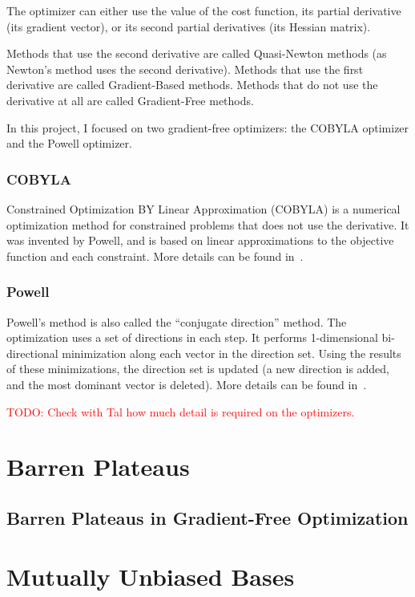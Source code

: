 \documentclass[a4paper,12pt]{article}
\newcommand{\mytodo}[1]{\textcolor{red}{TODO: #1}}
\begin{document}
The optimizer can either use the value of the cost function, its partial derivative (its gradient vector), or its second partial derivatives (its Hessian matrix).

Methods that use the second derivative are called Quasi-Newton methods (as Newton's method uses the second derivative). Methods that use the first derivative are called Gradient-Based methods. Methods that do not use the derivative at all are called Gradient-Free methods.

In this project, I focused on two gradient-free optimizers: the COBYLA optimizer and the Powell optimizer.

\subsubsection{COBYLA}
Constrained Optimization BY Linear Approximation (COBYLA) is a numerical optimization method for constrained problems that does not use the derivative. It was invented by Powell, and is based on linear approximations to the objective function and each constraint.
More details can be found in~\cite{Powell1994}.

\subsubsection{Powell}
Powell's method is also called the ``conjugate direction'' method.
The optimization uses a set of directions in each step. It performs 1-dimensional bi-directional minimization along each vector in the direction set. Using the results of these minimizations, the direction set is updated (a new direction is added, and the most dominant vector is deleted).
More details can be found in~\cite{Powell1964}.

\mytodo{Check with Tal how much detail is required on the optimizers.}

\section{Barren Plateaus} \label{sec:bps}

\subsection{Barren Plateaus in Gradient-Free Optimization}


\section{Mutually Unbiased Bases}
\end{document}
